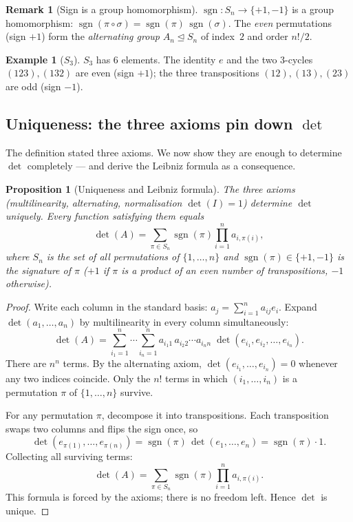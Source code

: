 \documentclass[11pt]{article}
\theoremstyle{definition}
\newtheorem{example}{Example}[section]
\newtheorem{remark}{Remark}[section]
\theoremstyle{plain}
\newtheorem{proposition}{Proposition}[section]
\begin{document}
\begin{remark}[Sign is a group homomorphism]
  $\operatorname{sgn}:S_n\to\{+1,-1\}$ is a group homomorphism:
  $\operatorname{sgn}(\pi\circ\sigma)=\operatorname{sgn}(\pi)\,\operatorname{sgn}(\sigma)$.
  The \emph{even} permutations (sign $+1$) form the \emph{alternating group}
  $A_n\trianglelefteq S_n$ of index~$2$ and order $n!/2$.
\end{remark}

\begin{example}[$S_3$]
  $S_3$ has $6$ elements.
  The identity $e$ and the two $3$-cycles $(123),(132)$ are even
  (sign $+1$); the three transpositions $(12),(13),(23)$ are odd
  (sign $-1$).
\end{example}

\subsection{Uniqueness: the three axioms pin down $\det$}

The definition stated three axioms.  We now show they are enough to
determine $\det$ completely --- and derive the Leibniz formula as a
consequence.

\begin{proposition}[Uniqueness and Leibniz formula]
  The three axioms (multilinearity, alternating, normalisation
  $\det(I)=1$) determine $\det$ uniquely.  Every function satisfying
  them equals
  \[
    \det(A)
    = \sum_{\pi\in S_n}\operatorname{sgn}(\pi)\prod_{i=1}^n a_{i,\pi(i)},
  \]
  where $S_n$ is the set of all permutations of $\{1,\ldots,n\}$ and
  $\operatorname{sgn}(\pi)\in\{+1,-1\}$ is the \emph{signature} of $\pi$
  ($+1$ if $\pi$ is a product of an even number of transpositions,
  $-1$ otherwise).
\end{proposition}
\begin{proof}
  Write each column in the standard basis:
  $a_j = \sum_{i=1}^n a_{ij}e_i$.
  Expand $\det(a_1,\ldots,a_n)$ by multilinearity in every column
  simultaneously:
  \[
    \det(A)
    = \sum_{i_1=1}^n\cdots\sum_{i_n=1}^n
      a_{i_1 1}\,a_{i_2 2}\cdots a_{i_n n}
      \;\det(e_{i_1},e_{i_2},\ldots,e_{i_n}).
  \]
  There are $n^n$ terms.  By the alternating axiom,
  $\det(e_{i_1},\ldots,e_{i_n})=0$ whenever any two indices coincide.
  Only the $n!$ terms in which $(i_1,\ldots,i_n)$ is a permutation
  $\pi$ of $\{1,\ldots,n\}$ survive.

  For any permutation $\pi$, decompose it into transpositions.
  Each transposition swaps two columns and flips the sign once, so
  \[
    \det(e_{\pi(1)},\ldots,e_{\pi(n)})
    = \operatorname{sgn}(\pi)\,\det(e_1,\ldots,e_n)
    = \operatorname{sgn}(\pi)\cdot 1.
  \]
  Collecting all surviving terms:
  \[
    \det(A) = \sum_{\pi\in S_n}\operatorname{sgn}(\pi)
              \prod_{i=1}^n a_{i,\pi(i)}.
  \]
  This formula is forced by the axioms; there is no freedom left.
  Hence $\det$ is unique.
\end{proof}
\end{document}
